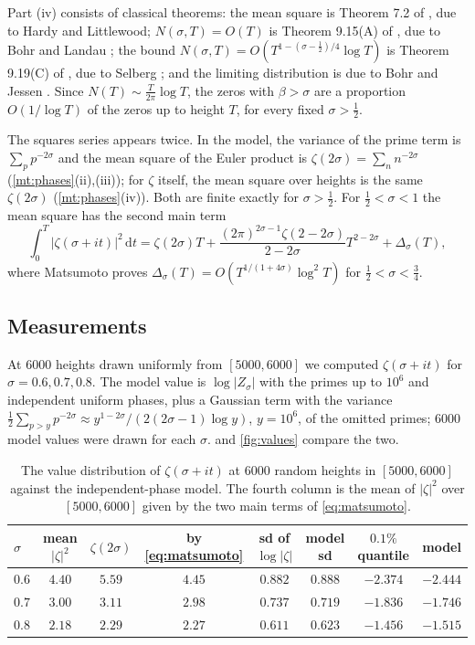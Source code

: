 \documentclass[11pt]{article}
\theoremstyle{definition}\newtheorem{definition}[theorem]{Definition}
\theoremstyle{remark}\newtheorem{remark}[theorem]{Remark}
\theoremstyle{definition}\newtheorem{axiom}{Axiom}
\newcommand{\dd}{\,\mathrm d}\newcommand{\e}{\mathrm e}
\begin{document}
Part (iv) consists of classical theorems: the mean square is Theorem 7.2 of \cite{Titchmarsh}, due to Hardy and Littlewood; $N(\sigma,T)=O(T)$ is Theorem 9.15(A) of \cite{Titchmarsh}, due to Bohr and Landau \cite{BohrLandau}; the bound $N(\sigma,T)=O(T^{1-(\sigma-\frac12)/4}\log T)$ is Theorem 9.19(C) of \cite{Titchmarsh}, due to Selberg \cite{Selberg46}; and the limiting distribution is due to Bohr and Jessen \cite{BohrJessen1,BohrJessen2}. Since $N(T)\sim\frac T{2\pi}\log T$, the zeros with $\beta>\sigma$ are a proportion $O(1/\log T)$ of the zeros up to height $T$, for every fixed $\sigma>\frac12$.

The squares series appears twice. In the model, the variance of the prime term is $\sum_pp^{-2\sigma}$ and the mean square of the Euler product is $\zeta(2\sigma)=\sum_nn^{-2\sigma}$ (\cref{mt:phases}(ii),(iii)); for $\zeta$ itself, the mean square over heights is the same $\zeta(2\sigma)$ (\cref{mt:phases}(iv)). Both are finite exactly for $\sigma>\frac12$. For $\frac12<\sigma<1$ the mean square has the second main term
\begin{equation}\label{eq:matsumoto}
\int_0^T|\zeta(\sigma+it)|^2\dd t=\zeta(2\sigma)T+\frac{(2\pi)^{2\sigma-1}\zeta(2-2\sigma)}{2-2\sigma}T^{2-2\sigma}+\Delta_\sigma(T),
\end{equation}
where Matsumoto \cite{Matsumoto} proves $\Delta_\sigma(T)=O(T^{1/(1+4\sigma)}\log^2T)$ for $\frac12<\sigma<\frac34$.

\subsection{Measurements}

At $6000$ heights drawn uniformly from $[5000,6000]$ we computed $\zeta(\sigma+it)$ for $\sigma=0.6,0.7,0.8$. The model value is $\log|Z_\sigma|$ with the primes up to $10^6$ and independent uniform phases, plus a Gaussian term with the variance $\frac12\sum_{p>y}p^{-2\sigma}\approx y^{1-2\sigma}/(2(2\sigma-1)\log y)$, $y=10^6$, of the omitted primes; $6000$ model values were drawn for each $\sigma$.  and \cref{fig:values} compare the two.

\begin{table}[!htbp]\centering\small
\begin{tabular}{@{}lccccccc@{}}\toprule
$\sigma$ & mean $|\zeta|^2$ & $\zeta(2\sigma)$ & by \eqref{eq:matsumoto} & sd of $\log|\zeta|$ & model sd & $0.1\%$ quantile & model\\\midrule
$0.6$ & $4.40$ & $5.59$ & $4.45$ & $0.882$ & $0.888$ & $-2.374$ & $-2.444$\\
$0.7$ & $3.00$ & $3.11$ & $2.98$ & $0.737$ & $0.719$ & $-1.836$ & $-1.746$\\
$0.8$ & $2.18$ & $2.29$ & $2.27$ & $0.611$ & $0.623$ & $-1.456$ & $-1.515$\\\bottomrule
\end{tabular}
\caption{The value distribution of $\zeta(\sigma+it)$ at $6000$ random heights in $[5000,6000]$ against the independent-phase model. The fourth column is the mean of $|\zeta|^2$ over $[5000,6000]$ given by the two main terms of \eqref{eq:matsumoto}.}\label{tab:values}
\end{table}
\end{document}
